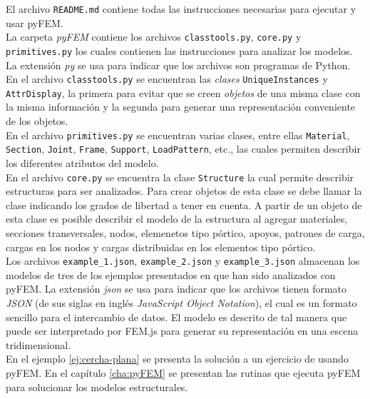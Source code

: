 El archivo \verb|README.md| contiene todas las instrucciones necesarias para ejecutar y usar pyFEM.\\


La carpeta \emph{pyFEM} contiene los archivos \verb|classtools.py|, \verb|core.py| y \verb|primitives.py| los cuales contienen las instrucciones para analizar los modelos. La extensión \emph{py} se usa para indicar que los archivos son programas de Python.\\

En el archivo \verb|classtools.py| se encuentran las \emph{clases} \verb|UniqueInstances| y \verb|AttrDisplay|, la primera para evitar que se creen \emph{objetos} de una misma clase con la misma información y la segunda para generar una representación conveniente de los objetos.\\

En el archivo \verb|primitives.py| se encuentran varias clases, entre ellas \verb|Material|, \verb|Section|, \verb|Joint|, \verb|Frame|, \verb|Support|, \verb|LoadPattern|, etc., las cuales permiten describir los diferentes atributos del modelo.\\

En el archivo \verb|core.py| se encuentra la clase \verb|Structure| la cual permite describir estructuras para ser analizados. Para crear objetos de esta clase se debe llamar la clase indicando los grados de libertad a tener en cuenta. A partir de un objeto de esta clase es posible describir el modelo de la estructura al agregar materiales, secciones transversales, nodos, elemenetos tipo pórtico, apoyos, patrones de carga, cargas en los nodos y cargas distribuidas en los elementos tipo pórtico.\\

Los archivos \verb|example_1.json|, \verb|example_2.json| y \verb|example_3.json| almacenan los modelos de tres de los ejemplos presentados en \cite{escamilla1995microcomputadores} que han sido analizados con pyFEM. La extensión \emph{json} se usa para indicar que los archivos tienen formato \emph{JSON} (de sus siglas en inglés \emph{JavaScript Object Notation}), el cual es un formato sencillo para el intercambio de datos. El modelo es descrito de tal manera que puede ser interpretado por FEM.js para generar su representación en una escena tridimensional. \\

En el ejemplo \ref{ej:cercha-plana} se presenta la solución a un ejercicio de \cite{escamilla1995microcomputadores} usando pyFEM. En el capítulo \ref{cha:pyFEM} se presentan las rutinas que ejecuta pyFEM para solucionar los modelos estructurales.\\

